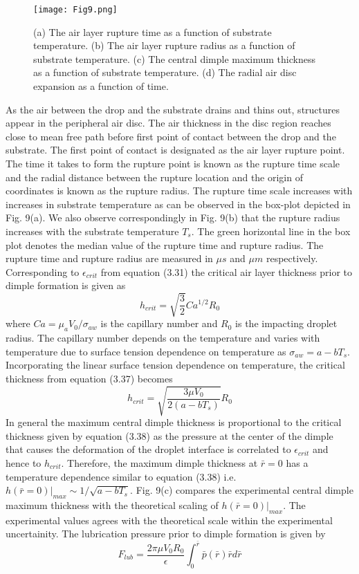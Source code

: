 \documentclass{jfm}
\begin{document}
\begin{figure*}
    \centering
    \texttt{[image: Fig9.png]}
    \caption{
    (a) The air layer rupture time as a function of substrate temperature. (b) The air layer rupture radius as a function of substrate temperature. (c) The central dimple maximum thickness as a function of substrate temperature. (d) The radial air disc expansion as a function of time.}
    \label{Figure9}
\end{figure*}
As the air between the drop and the substrate drains and thins out, structures appear in the peripheral air disc. The air thickness in the disc region reaches close to mean free path before first point of contact between the drop and the substrate. The first point of contact is designated as the air layer rupture point. The time it takes to form the rupture point is known as the rupture time scale and the radial distance between the rupture location and the origin of coordinates is known as the rupture radius.  
The rupture time scale increases with increases in substrate temperature as can be observed in the box-plot depicted in Fig. 9(a). We also observe correspondingly in Fig. 9(b) that the rupture radius increases with the substrate temperature $T_s$. The green horizontal line in the box plot denotes the median value of the rupture time and rupture radius. The rupture time and rupture radius are measured in ${\mu}s$ and ${\mu}m$ respectively. Corresponding to ${\epsilon}_{crit}$ from equation (3.31) the critical air layer thickness prior to dimple formation is given as 
\begin{equation}
    h_{crit} =  \sqrt{\frac{3}{2}}Ca^{1/2}R_0
\end{equation}
where $Ca={\mu}_aV_0/{\sigma}_{aw}$ is the capillary number and $R_0$ is the impacting droplet radius.
The capillary number depends on the temperature and varies with temperature due to surface tension dependence on temperature as ${\sigma}_{aw}=a-bT_s$. Incorporating the linear surface tension dependence on temperature, the critical thickness from equation (3.37) becomes
\begin{equation}
    h_{crit}=\sqrt{\frac{3{\mu}V_0}{2(a-bT_s)}}R_0
\end{equation}
In general the maximum central dimple thickness is proportional to the critical thickness given by equation (3.38) as the pressure at the center of the dimple that causes the deformation of the droplet interface is correlated to ${\epsilon}_{crit}$ and hence to $h_{crit}$.
Therefore, the maximum dimple thickness at $\bar{r}=0$ has a temperature dependence similar to equation (3.38) i.e. $h(\bar{r}=0)|_{max}{\sim}1/\sqrt{a-bT_s}$.
Fig. 9(c) compares the experimental central dimple maximum thickness with the theoretical scaling of $h(\bar{r}=0)|_{max}$. The experimental values agrees with the theoretical scale within the experimental uncertainity.
The lubrication pressure prior to dimple formation is given by
\begin{equation}
    F_{lub} = \frac{2{\pi}{\mu}V_0R_0}{\epsilon}\int_0^{\bar{r}}\bar{p}(\bar{r})\bar{r}d\bar{r}
\end{equation}
\end{document}
